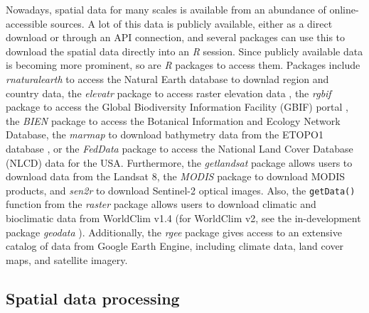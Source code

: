 \documentclass[smallextended]{svjour3}       %
\begin{document}
Nowadays, spatial data for many scales is available from an abundance of online-accessible sources.
A lot of this data is publicly available, either as a direct download or through an API connection, and several packages can use this to download the spatial data directly into an \emph{R} session.
Since publicly available data is becoming more prominent, so are \emph{R} packages to access them.
Packages include \emph{rnaturalearth} \cite{South2017} to access the Natural Earth database to downlad region and country data, the \emph{elevatr} package to access raster elevation data \cite{R-elevatr}, the \emph{rgbif} package to access the Global Biodiversity Information Facility (GBIF) portal \cite{R-rgbif}, the \emph{BIEN} package \cite{Maitner2020} to access the Botanical Information and Ecology Network Database, the \emph{marmap} to download bathymetry data from the ETOPO1 database \cite{Pante2013}, or the \emph{FedData} package \cite{R-FedData} to access the National Land Cover Database (NLCD) data for the USA.
Furthermore, the \emph{getlandsat} package \cite{Chamberlain2018} allows users to download data from the Landsat 8, the \emph{MODIS} package \cite{Mattiuzzi2020} to download MODIS products, and \emph{sen2r} \cite{R-sen2r} to download Sentinel-2 optical images.
Also, the \texttt{getData()} function from the \emph{raster} package allows users to download climatic and bioclimatic data from WorldClim v1.4 (for WorldClim v2, see the in-development package \emph{geodata} ).
Additionally, the \emph{rgee} package \cite{R-rgee} gives access to an extensive catalog of data from Google Earth Engine, including climate data, land cover maps, and satellite imagery.

\hypertarget{spatial-data-processing}{%
\subsection{Spatial data processing}\label{spatial-data-processing}}
\end{document}
